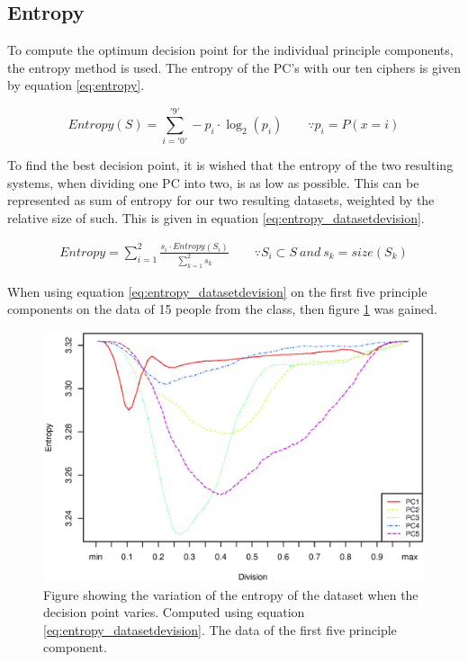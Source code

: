 \subsection{Entropy}
To compute the optimum decision point for the individual principle components, the entropy method is used.
The entropy of the PC's with our ten ciphers is given by equation \ref{eq:entropy}.

\begin{equation}
Entropy(S) = \sum_{i = '0'}^{'9'} -p_i \cdot \log_2(p_i) 
\qquad \because p_i = P(x = i)
\label{eq:entropy}
\end{equation}

To find the best decision point, it is wished that the entropy of the two resulting systems, when dividing one PC into two, is as low as possible.
This can be represented as sum of entropy for our two resulting datasets, weighted by the relative size of such.
This is given in equation \ref{eq:entropy_datasetdevision}.

\begin{eqnarray}
Entropy = \sum_{i = 1}^{2} \frac{s_i \cdot Entropy(S_i)}{\sum_{k = 1}^{2} s_k} 
\qquad \because S_i \subset S\ and\ s_k = size(S_k)
\label{eq:entropy_datasetdevision}
\end{eqnarray}

When using equation \ref{eq:entropy_datasetdevision} on the first five principle components on the data of 15 people from the class, then figure \ref{fig:entropy_pc5} was gained.

\begin{figure}[H]
\centering
\includegraphics[width = 0.95 \textwidth]{graphics/entropy_pc}
\caption[Variation of the entropy]{Figure showing the variation of the entropy of the dataset when the decision point varies. Computed using equation \ref{eq:entropy_datasetdevision}. The data of the first five principle component.}
\label{fig:entropy_pc5}
\end{figure}


